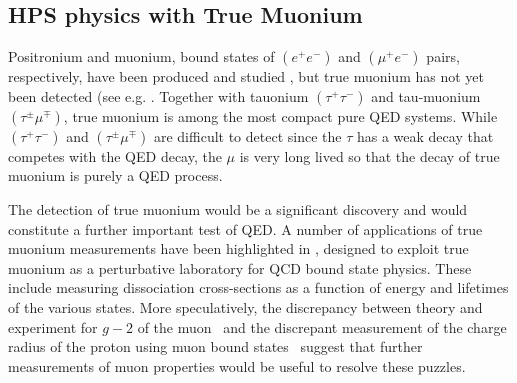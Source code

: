\subsection{HPS physics with True Muonium}

Positronium and muonium, bound states of $(e^+ e^-)$ and $(\mu^+ e^-)$ pairs, respectively, have been
produced and studied \cite{Deutsch:1951zza,Friedman:1957mz,Hughes:1960zz}, but true muonium has not yet been 
detected (see e.g. \cite{Holvik:1986ty,ArteagaRomero:2000yh,Brodsky:2009gx,Bilenky:1969zd,Hughes:1971,Malenfant:1987tm,Karshenboim:1998we,Owen:1972,Jentschura:1997ma,Jentschura:1997tv,Karshenboim:1998am}. 
Together with tauonium $(\tau^+ \tau^-)$ and tau-muonium $(\tau^{\pm} \mu^{\mp})$, true muonium is among the most
compact pure QED systems. While $(\tau^+ \tau^-)$ and $(\tau^{\pm} \mu^{\mp})$ are difficult to detect since the $\tau$ has a
weak decay that competes with the QED decay, the $\mu$ is very long lived so that the decay of true
muonium is purely a QED process. 

The detection of true muonium would be a significant discovery and would constitute a further important test of QED.   
A number of applications of true muonium measurements have been highlighted in 
\cite{Brodsky:2009gx}, designed to exploit true muonium as a perturbative laboratory 
for QCD bound state physics. 
These include measuring dissociation cross-sections as a function of energy and lifetimes of the various states. 
More speculatively, the discrepancy between theory and experiment for $g-2$ of the muon~\cite{Bennett:2006fi} and the discrepant measurement of
the charge radius of the proton using muon bound states~\cite{Pohl:2010zza} suggest that further measurements of 
muon properties would be useful to resolve these puzzles. 





